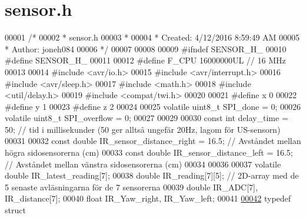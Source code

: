 \hypertarget{sensor_2sensor_2sensor_8h_source}{}\section{sensor.\+h}
\label{sensor_2sensor_2sensor_8h_source}

\begin{DoxyCode}
00001 \textcolor{comment}{/*}
00002 \textcolor{comment}{ * sensor.h}
00003 \textcolor{comment}{ *}
00004 \textcolor{comment}{ * Created: 4/12/2016 8:59:49 AM}
00005 \textcolor{comment}{ *  Author: joneh084}
00006 \textcolor{comment}{ */} 
00007 
00008 
00009 \textcolor{preprocessor}{#ifndef SENSOR\_H\_}
00010 \textcolor{preprocessor}{#define SENSOR\_H\_}
00011 
00012 \textcolor{preprocessor}{#define F\_CPU 16000000UL        // 16 MHz}
00013 
00014 \textcolor{preprocessor}{#include <avr/io.h>}
00015 \textcolor{preprocessor}{#include <avr/interrupt.h>}
00016 \textcolor{preprocessor}{#include <avr/sleep.h>}
00017 \textcolor{preprocessor}{#include <math.h>}
00018 \textcolor{preprocessor}{#include <util/delay.h>}
00019 \textcolor{preprocessor}{#include <compat/twi.h>}
00020 
00021 \textcolor{preprocessor}{#define x 0}
00022 \textcolor{preprocessor}{#define y 1}
00023 \textcolor{preprocessor}{#define z 2}
00024 
00025 \textcolor{keyword}{volatile} uint8\_t SPI\_done = 0;
00026 \textcolor{keyword}{volatile} uint8\_t SPI\_overflow = 0;
00027 
00029 
00030 \textcolor{keyword}{const} \textcolor{keywordtype}{int} delay\_time = 50;                          \textcolor{comment}{// tid i millisekunder (50 ger alltså ungefär 20Hz,
       lagom för US-sensorn)}
00031 
00032 \textcolor{keyword}{const} \textcolor{keywordtype}{double} IR\_sensor\_distance\_right = 16.5;       \textcolor{comment}{// Avståndet mellan högra sidosensorerna (cm)}
00033 \textcolor{keyword}{const} \textcolor{keywordtype}{double} IR\_sensor\_distance\_left = 16.5;        \textcolor{comment}{// Avståndet mellan vänstra sidosensorerna (cm)}
00034 
00036 
00037 \textcolor{keyword}{volatile} \textcolor{keywordtype}{double} IR\_latest\_reading[7];
00038 \textcolor{keywordtype}{double} IR\_reading[7][5];                            \textcolor{comment}{// 2D-array med de 5 senaste avläsningarna för de 7
       sensorerna}
00039 \textcolor{keywordtype}{double} IR\_ADC[7], IR\_distance[7];
00040 \textcolor{keywordtype}{float} IR\_Yaw\_right, IR\_Yaw\_left;                    
00041 
\hypertarget{sensor_2sensor_2sensor_8h_source.tex_l00042}{}\hyperlink{struct_a_d_c__distance__pair}{00042} \textcolor{keyword}{typedef} \textcolor{keyword}{struct}

\end{DoxyCode}
